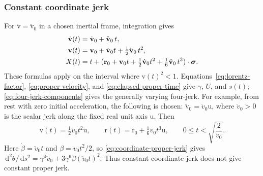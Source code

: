 \documentclass[11pt]{article}
\newcommand{\pv}[1]{{#1}}
\newcommand{\vstyle}[1]{{\bm{\mathrm{#1}}}}
\newcommand{\pU}{\pv{U}}
\newcommand{\pX}{\pv{X}}
\numberwithin{equation}{section}
\newcommand{\dotprod}{\cdot}
\newcommand{\bsig}{\vstyle{\sigma}}
\newcommand{\br}{\vstyle{r}}
\newcommand{\bv}{\vstyle{v}}
\newcommand{\bu}{\vstyle{u}}
\newcommand{\dd}{\,\mathrm d}
\begin{document}
\subsubsection{Constant coordinate jerk}
For $\ddot{\bv}=\ddot{\bv}_0$ in a chosen inertial frame, integration gives
\begin{align}
 \dot{\bv}(t)&=\dot{\bv}_0+\ddot{\bv}_0\,t,\notag\\
 \bv(t)&=\bv_0+\dot{\bv}_0t+\tfrac12\ddot{\bv}_0\,t^2,\notag\\
 \pX(t)&=t+
 (\br_0+\bv_0t+\tfrac12\dot{\bv}_0t^2+\tfrac16\ddot{\bv}_0\,t^3)\dotprod\bsig.
 \label{eq:constant-coordinate-jerk}
\end{align}
These formulas apply on the interval where $\bv(t)^2<1$.
Equations~\eqref{eq:lorentz-factor}, \eqref{eq:proper-velocity}, and
\eqref{eq:elapsed-proper-time} give $\gamma$, $\pU$, and $s(t)$;
\eqref{eq:four-jerk-components} gives the generally varying four-jerk.
For example, from rest with zero initial acceleration, the following is chosen:
$\ddot{\bv}_0=\ddot{v}_0\bu$, where $\ddot{v}_0>0$ is the scalar jerk
along the fixed real unit axis $\bu$. Then
\[
 \bv(t)=\tfrac12\ddot{v}_0t^2\bu,\qquad
 \br(t)=\br_0+\tfrac16\ddot{v}_0t^3\bu,\qquad
 0\le t<\sqrt{\frac{2}{\ddot{v}_0}}.
\]
Here $\dot{\beta}=\ddot{v}_0t$ and $\beta=\ddot{v}_0t^2/2$, so
\eqref{eq:coordinate-proper-jerk} gives
$\dd^2\theta/\dd s^2=\gamma^4\ddot{v}_0+3\gamma^6\beta(\ddot{v}_0t)^2$.
Thus constant coordinate jerk does not give constant proper jerk.
\end{document}
